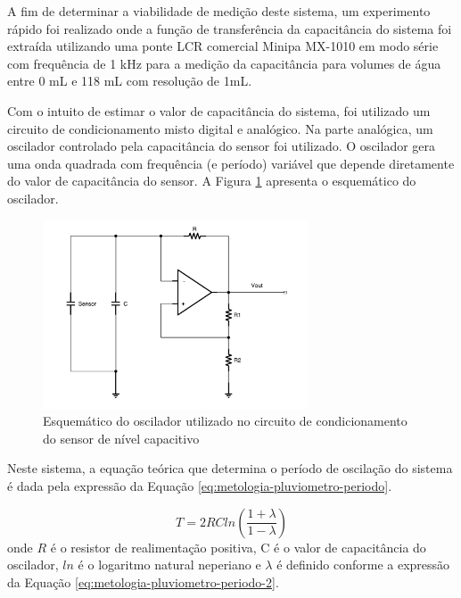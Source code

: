 \documentclass[a4paper]{instrumentacao}
\begin{document}
A fim de determinar a viabilidade de medição deste sistema, um experimento rápido foi realizado onde a função de transferência da capacitância do sistema foi extraída utilizando uma ponte LCR comercial Minipa MX-1010 \cite{ponte-minipa} em modo série com frequência de 1 kHz para a medição da capacitância para volumes de água entre 0 mL e 118 mL com resolução de 1mL.

Com o intuito de estimar o valor de capacitância do sistema, foi utilizado um circuito de condicionamento misto digital e analógico. Na parte analógica, um oscilador controlado pela capacitância do sensor foi utilizado. O oscilador gera uma onda quadrada com frequência (e período) variável que depende diretamente do valor de capacitância do sensor. A Figura \ref{fig:metodologia-capacitivo-oscilador} apresenta o esquemático do oscilador.

\begin{figure}[H]
	\centering
	\includegraphics[width=0.7\textwidth]{Circuitos/Pluviometro-Oscilador.pdf}
	\caption{Esquemático do oscilador utilizado no circuito de condicionamento do sensor de nível capacitivo}
	\label{fig:metodologia-capacitivo-oscilador}
\end{figure}

Neste sistema, a equação teórica que determina o período de oscilação do sistema é dada pela expressão da Equação \ref{eq:metologia-pluviometro-periodo}.

\begin{equation}
	T = 2 R C ln \left(\frac{1+\lambda}{1-\lambda}\right)
	\label{eq:metologia-pluviometro-periodo}
\end{equation}
\noindent onde $R$ é o resistor de realimentação positiva, C é o valor de capacitância do oscilador, $ln$ é o logaritmo natural neperiano e $\lambda$ é definido conforme a expressão da Equação \ref{eq:metologia-pluviometro-periodo-2}.
\end{document}
